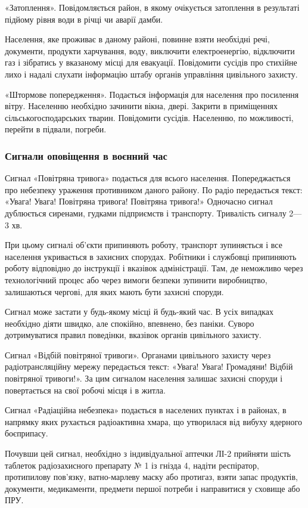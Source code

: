 «Затоплення». Повідомляється район, в якому очікується затоплення в результаті підйому рівня води в річці чи аварії дамби.

Населення, яке проживає в даному районі, повинне взяти необхідні речі, документи, продукти харчування, воду, виключити електроенергію, відключити газ і зібратись у вказаному місці для евакуації. Повідомити сусідів про стихійне лихо і надалі слухати інформацію штабу органів управління цивільного захисту.

«Штормове попередження». Подається інформація для населення про посилення вітру. Населенню необхідно зачинити вікна, двері. Закрити в приміщеннях сільськогосподарських тварин. Повідомити сусідів. Населенню, по можливості, перейти в підвали, погреби.

\subsubsection{Сигнали оповіщення в воєнний час}

Сигнал «Повітряна тривога» подається для всього населення. Попереджається про небезпеку ураження противником даного району. По радіо передається текст: «Увага! Увага! Повітряна тривога! Повітряна тривога!» Одночасно сигнал дублюється сиренами, гудками підприємств і транспорту. Тривалість сигналу 2—3 хв.

При цьому сигналі об'єкти припиняють роботу, транспорт зупиняється і все населення укривається в захисних спорудах. Робітники і службовці припиняють роботу відповідно до інструкції і вказівок адміністрації. Там, де неможливо через технологічний процес або через вимоги безпеки зупинити виробництво, залишаються чергові, для яких мають бути захисні споруди.

Сигнал може застати у будь-якому місці й будь-який час. В усіх випадках необхідно діяти швидко, але спокійно, впевнено, без паніки. Суворо дотримуватися правил поведінки, вказівок органів цивільного захисту.

Сигнал «Відбій повітряної тривоги». Органами цивільного захисту через радіотрансляційну мережу передається текст: «Увага! Увага! Громадяни! Відбій повітряної тривоги!». За цим сигналом населення залишає захисні споруди і повертається на свої робочі місця і в житла.

Сигнал «Радіаційна небезпека» подається в населених пунктах і в районах, в напрямку яких рухається радіоактивна хмара, що утворилася від вибуху ядерного боєприпасу.

Почувши цей сигнал, необхідно з індивідуальної аптечки ЛІ-2 прийняти шість таблеток радіозахисного препарату № 1 із гнізда 4, надіти респіратор, протипилову пов'язку, ватно-марлеву маску або протигаз, взяти запас продуктів, документи, медикаменти, предмети першої потреби і направитися у сховище або ПРУ.

